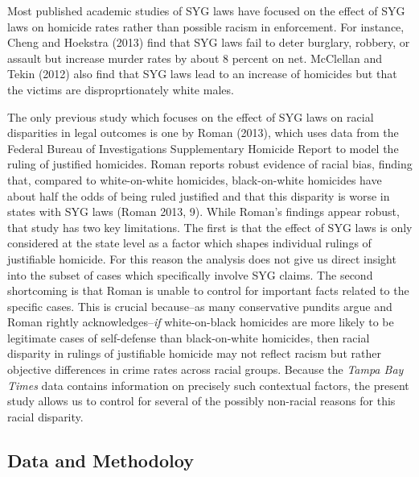 \documentclass[12pt,article]{article}
\begin{document}
Most published academic studies of SYG laws have focused on the effect
of SYG laws on homicide rates rather than possible racism in
enforcement. For instance, Cheng and Hoekstra (2013) find that SYG laws
fail to deter burglary, robbery, or assault but increase murder rates by
about 8 percent on net. McClellan and Tekin (2012) also find that SYG
laws lead to an increase of homicides but that the victims are
disproprtionately white males.

The only previous study which focuses on the effect of SYG laws on
racial disparities in legal outcomes is one by Roman (2013), which uses
data from the Federal Bureau of Investigations Supplementary Homicide
Report to model the ruling of justified homicides. Roman reports robust
evidence of racial bias, finding that, compared to white-on-white
homicides, black-on-white homicides have about half the odds of being
ruled justified and that this disparity is worse in states with SYG laws
(Roman 2013, 9). While Roman's findings appear robust, that study has
two key limitations. The first is that the effect of SYG laws is only
considered at the state level as a factor which shapes individual
rulings of justifiable homicide. For this reason the analysis does not
give us direct insight into the subset of cases which specifically
involve SYG claims. The second shortcoming is that Roman is unable to
control for important facts related to the specific cases. This is
crucial because--as many conservative pundits argue and Roman rightly
acknowledges--\emph{if} white-on-black homicides are more likely to be
legitimate cases of self-defense than black-on-white homicides, then
racial disparity in rulings of justifiable homicide may not reflect
racism but rather objective differences in crime rates across racial
groups. Because the \emph{Tampa Bay Times} data contains information on
precisely such contextual factors, the present study allows us to
control for several of the possibly non-racial reasons for this racial
disparity.

\subsection{Data and Methodoloy}\label{data-and-methodoloy}
\end{document}
